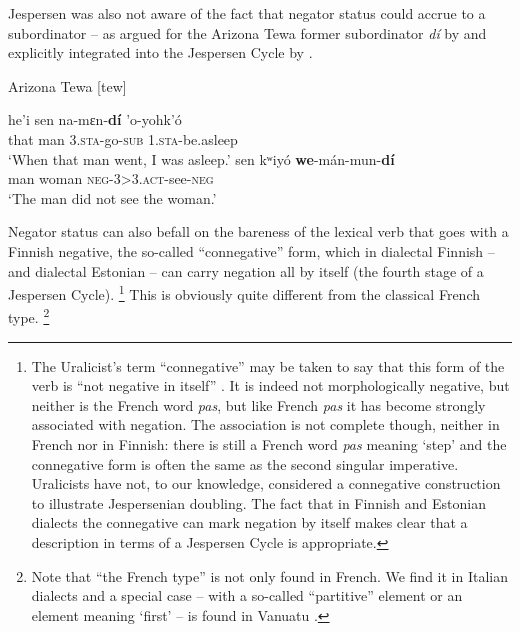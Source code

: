 ﻿\documentclass[output=paper]{langsci/langscibook}
\begin{document}
%
Jespersen was also not aware of the fact that negator status could accrue
to a subordinator -- as argued for the Arizona Tewa former subordinator
\textit{dí} by \textcite{Kroskrity1984} and explicitly integrated into the
Jespersen Cycle by \textcite[83]{Auwera2010}. 
%
\begin{exe}\ex\label{ex:int-tewa-man}
Arizona Tewa [tew] 
\begin{xlist}
\ex \gll he'i  sen  na-mεn-\textbf{dí} 'o-yohk'ó \\
    that  man  3.\textsc{sta}-go-\textsc{sub}  1.\textsc{sta}-be.asleep \\
    \glt `When that man went, I was asleep.'
\ex \gll sen  kʷiyó    \textbf{we}-mán-mun-\textbf{dí}\\
man  woman  \textsc{neg-3>3.act}-see-\textsc{neg}\\
\glt `The man did not see the woman.'
\end{xlist}
    \end{exe}
%
Negator status can also befall on the bareness of the lexical verb that
goes with a Finnish negative, the so-called ``connegative'' form, which in
dialectal Finnish \citep[238]{Miestamo2005} -- and dialectal
Estonian
\citep[425--426]{Tamm2015} -- can carry negation all by itself (the fourth
stage of a Jespersen Cycle).%
%
    \footnote{The Uralicist's term ``connegative'' may be taken to say that
    this form of the verb is ``not negative in itself''
    \parencites[82]{Miestamo2005}[56]{WagnerNagy2011}. It is indeed not
    morphologically negative, but neither is the French word \textit{pas},
    but like French \textit{pas} it has become strongly associated with
    negation. The association is not complete though, neither in French nor
    in Finnish: there is still a French word \textit{pas} meaning `step'
    and the connegative form is often the same as the second singular
    imperative.  Uralicists have not, to our knowledge, considered a
    connegative construction to illustrate Jespersenian doubling. The fact
    that in Finnish and Estonian dialects the connegative can mark negation
    by itself makes clear that a description in terms of a Jespersen Cycle
    is appropriate.} %
%
This is obviously quite different from the classical French type.%
%
    \footnote{Note that ``the French type'' is not only found in French.
    We find it in Italian dialects and a special case -- with a so-called
    ``partitive'' element or an element meaning `first' -- is found in
    Vanuatu \parencite[72--74]{VossenAuwera2014}.} %
\end{document}
